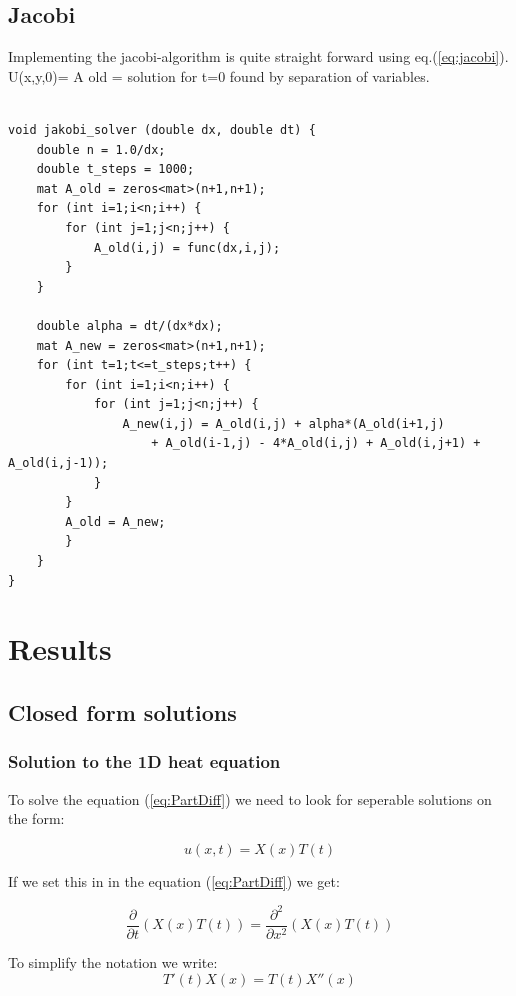 \documentclass[a4paper,10pt]{article}
\begin{document}
\subsection{Jacobi}
Implementing the jacobi-algorithm is quite straight forward using eq.(\ref{eq:jacobi}). U(x,y,0)= A old = solution for t=0 found by separation of variables.
\begin{verbatim}

void jakobi_solver (double dx, double dt) {
    double n = 1.0/dx;
    double t_steps = 1000;
    mat A_old = zeros<mat>(n+1,n+1);
    for (int i=1;i<n;i++) {
        for (int j=1;j<n;j++) {
            A_old(i,j) = func(dx,i,j);
        }
    }

    double alpha = dt/(dx*dx);
    mat A_new = zeros<mat>(n+1,n+1);
    for (int t=1;t<=t_steps;t++) {
        for (int i=1;i<n;i++) {
            for (int j=1;j<n;j++) {
                A_new(i,j) = A_old(i,j) + alpha*(A_old(i+1,j)
                    + A_old(i-1,j) - 4*A_old(i,j) + A_old(i,j+1) + A_old(i,j-1));
            }
        }
        A_old = A_new;
        }
    }
} 
\end{verbatim}


\section{Results}
\subsection{Closed form solutions}
\subsubsection{Solution to the 1D heat equation}
To solve the equation (\ref{eq:PartDiff}) we need to look for seperable solutions on the form:

\begin{equation}
 u(x,t) = X(x)T(t)
 \label{eq:u_xt}
\end{equation}

If we set this in in the equation (\ref{eq:PartDiff}) we get:

\begin{equation}
  \frac{\partial }{\partial t}(X(x)T(t)) = \frac{\partial ^2}{\partial x^2}(X(x)T(t))
\end{equation}

To simplify the notation we write:
\begin{equation}
 T'(t)X(x) = T(t)X''(x)
\end{equation}
\end{document}
